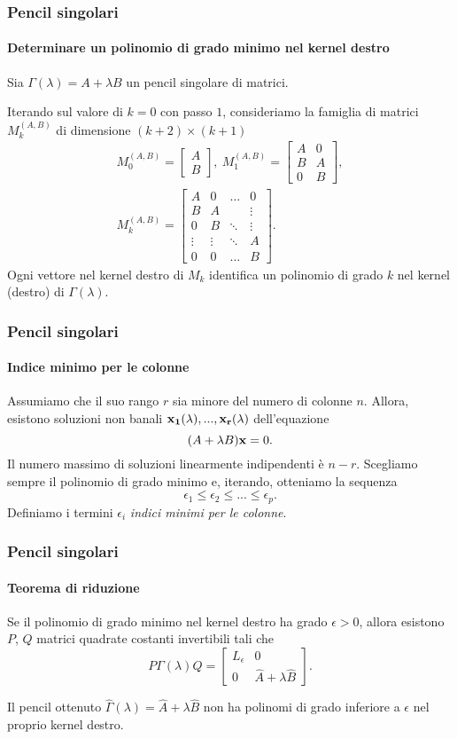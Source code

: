\begin{frame}
	\frametitle{Pencil singolari}
	\framesubtitle{Determinare un polinomio di grado minimo nel kernel destro}
	Sia \(\Gamma(\lambda)=A+\lambda B\) un pencil singolare di matrici.

	Iterando sul valore di $k = 0$ con passo $1$, consideriamo la famiglia di matrici
	$M_k^{(A, B)}$ di dimensione $(k+2) \times (k+1)$
	\begin{gather*}
		M_{0}^{(A, B)} =
			\begin{bmatrix}
				A \\
				B
			\end{bmatrix}, \
		M_{1}^{(A, B)} =
			\begin{bmatrix}
				A & 0 \\
				B & A \\
				0 & B
			\end{bmatrix}, \\
		M_{k}^{(A, B)} =
			\begin{bmatrix}
				A & 0 & \hdots &    0   \\
				B & A &        & \vdots \\
				0 & B & \ddots & \vdots \\
				\vdots & \vdots & \ddots & A \\
				0      &    0   & \hdots & B
			\end{bmatrix}.
	\end{gather*}
	\onslide<2-> Ogni vettore nel kernel destro di $M_k$ identifica un polinomio di grado $k$ nel
	kernel (destro) di
	$\Gamma(\lambda)$.
\end{frame}


\begin{frame}
	\frametitle{Pencil singolari}
	\framesubtitle{Indice minimo per le colonne}
	Assumiamo che il suo rango $r$ sia minore del numero di colonne $n$. Allora,
	esistono soluzioni non banali $\vb{x_1}(\lambda), ..., \vb{x_r}(\lambda)$ dell'equazione
	\[
		(A+\lambda B)\vb{x} = 0.
	\]
	\onslide<2-> Il numero massimo di soluzioni linearmente indipendenti \`e $n-r$. Scegliamo
	sempre il polinomio di grado minimo e, iterando, otteniamo la sequenza
	\[
		\epsilon_{1} \leq \epsilon_{2} \leq ... \leq \epsilon_{p}.
	\]
	Definiamo i termini $\epsilon_i$ \emph{indici minimi per le colonne}.
\end{frame}


\begin{frame}
	\frametitle{Pencil singolari}
	\framesubtitle{Teorema di riduzione}
	\begin{theorem}
		Se il polinomio di grado minimo nel kernel destro ha grado $\epsilon > 0$, allora esistono
		$P$, $Q$ matrici quadrate costanti invertibili tali che
		\[
			P\Gamma(\lambda)Q=\begin{bmatrix}
				L_{\epsilon} & 0 \\
				0 & \widehat{A} + \lambda \widehat{B}
			\end{bmatrix}.
		\]
	\end{theorem}
	 Il pencil ottenuto $\widehat{\Gamma}(\lambda) = \widehat{A} + \lambda \widehat{B}$
	non ha polinomi di grado inferiore a $\epsilon$ nel proprio kernel destro.
\end{frame}